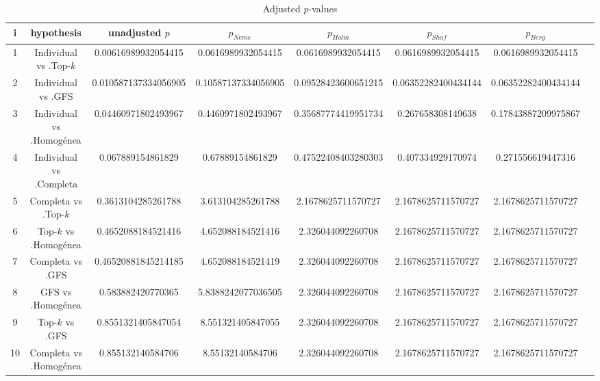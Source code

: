 \documentclass[a4paper,10pt]{article}
\begin{document}
\begin{landscape}
\begin{table}[!htp]
\centering\tiny
\caption{Adjusted $p$-values}
\begin{tabular}{cccccccc}
i&hypothesis&unadjusted $p$&$p_{Neme}$&$p_{Holm}$&$p_{Shaf}$&$p_{Berg}$\\
\hline
1&Individual vs .Top-$k$&0.00616989932054415&0.0616989932054415&0.0616989932054415&0.0616989932054415&0.0616989932054415\\
2&Individual vs .GFS&0.010587137334056905&0.10587137334056905&0.09528423600651215&0.06352282400434144&0.06352282400434144\\
3&Individual vs .Homogénea&0.04460971802493967&0.4460971802493967&0.35687774419951734&0.267658308149638&0.17843887209975867\\
4&Individual vs .Completa&0.067889154861829&0.67889154861829&0.47522408403280303&0.407334929170974&0.271556619447316\\
5&Completa vs .Top-$k$&0.3613104285261788&3.613104285261788&2.1678625711570727&2.1678625711570727&2.1678625711570727\\
6&Top-$k$ vs .Homogénea&0.4652088184521416&4.652088184521416&2.326044092260708&2.1678625711570727&2.1678625711570727\\
7&Completa vs .GFS&0.46520881845214185&4.652088184521419&2.326044092260708&2.1678625711570727&2.1678625711570727\\
8&GFS vs .Homogénea&0.583882420770365&5.8388242077036505&2.326044092260708&2.1678625711570727&2.1678625711570727\\
9&Top-$k$ vs .GFS&0.8551321405847054&8.551321405847055&2.326044092260708&2.1678625711570727&2.1678625711570727\\
10&Completa vs .Homogénea&0.855132140584706&8.55132140584706&2.326044092260708&2.1678625711570727&2.1678625711570727\\
\hline
\end{tabular}
\end{table}

\end{landscape}
\end{document}
